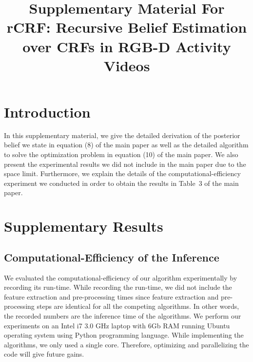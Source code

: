 \documentclass[conference]{IEEEtran}
\begin{document}
\title{Supplementary Material For \\ rCRF: Recursive Belief Estimation over CRFs in RGB-D Activity Videos}

\author{
\and
{}
}


\maketitle

\IEEEpeerreviewmaketitle

\section{Introduction}
In this supplementary material, we give the detailed derivation of the posterior belief we state in equation (8) of the main paper as well as the detailed algorithm to solve the optimization problem in equation (10) of the main paper. We also present the experimental results we did not include in the main paper due to the space limit. Furthermore, we explain the details of the computational-efficiency experiment we conducted in order to obtain the results in Table~3 of the main paper.

\section{Supplementary Results}
\subsection{Computational-Efficiency of the Inference}
We evaluated the computational-efficiency of our algorithm experimentally by recording its run-time. While recording the run-time, we did not include the feature extraction and pre-processing times since feature extraction and pre-processing steps are identical for all the competing algorithms. In other words, the recorded numbers are the inference time of the algorithms. We perform our experiments on an Intel i7 3.0 GHz laptop with 6Gb RAM running Ubuntu operating system using Python programming language. While implementing the algorithms, we only used a single core. Therefore, optimizing and parallelizing the code will give future gains.
\end{document}
